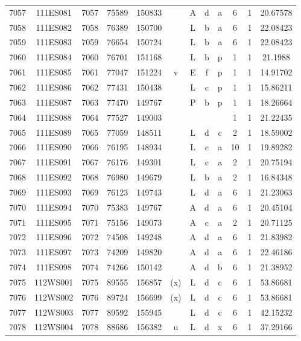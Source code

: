\begin{tabular}{|*{12}{c|}}
7057 & 111ES081 & 7057 & 75589 & 150833 &  & A & d & a & 6 & 1 & 20.67578 \\ 
7058 & 111ES082 & 7058 & 76389 & 150700 &  & L & b & a & 6 & 1 & 22.08423 \\ 
7059 & 111ES083 & 7059 & 76654 & 150724 &  & L & b & a & 6 & 1 & 22.08423 \\ 
7060 & 111ES084 & 7060 & 76701 & 151168 &  & L & b & p & 1 & 1 & 21.1988 \\ 
7061 & 111ES085 & 7061 & 77047 & 151224 & v & E & f & p & 1 & 1 & 14.91702 \\ 
7062 & 111ES086 & 7062 & 77431 & 150438 &  & L & c & p & 1 & 1 & 15.86211 \\ 
7063 & 111ES087 & 7063 & 77470 & 149767 &  & P & b & p & 1 & 1 & 18.26664 \\ 
7064 & 111ES088 & 7064 & 77527 & 149003 &  &  &  &  & 1 & 1 & 21.22435 \\ 
7065 & 111ES089 & 7065 & 77059 & 148511 &  & L & d & c & 2 & 1 & 18.59002 \\ 
7066 & 111ES090 & 7066 & 76195 & 148934 &  & L & c & a & 10 & 1 & 19.89282 \\ 
7067 & 111ES091 & 7067 & 76176 & 149301 &  & L & c & a & 2 & 1 & 20.75194 \\ 
7068 & 111ES092 & 7068 & 76980 & 149679 &  & L & b & a & 2 & 1 & 16.84348 \\ 
7069 & 111ES093 & 7069 & 76123 & 149743 &  & L & d & a & 6 & 1 & 21.23063 \\ 
7070 & 111ES094 & 7070 & 75383 & 149767 &  & A & d & a & 6 & 1 & 20.45104 \\ 
7071 & 111ES095 & 7071 & 75156 & 149073 &  & A & c & a & 2 & 1 & 20.71125 \\ 
7072 & 111ES096 & 7072 & 74508 & 149248 &  & A & d & a & 6 & 1 & 21.83982 \\ 
7073 & 111ES097 & 7073 & 74209 & 149820 &  & A & d & a & 6 & 1 & 22.46186 \\ 
7074 & 111ES098 & 7074 & 74266 & 150142 &  & A & d & b & 6 & 1 & 21.38952 \\ 
7075 & 112WS001 & 7075 & 89555 & 156857 & (x) & L & d & c & 6 & 1 & 53.86681 \\ 
7076 & 112WS002 & 7076 & 89724 & 156699 & (x) & L & d & c & 6 & 1 & 53.86681 \\ 
7077 & 112WS003 & 7077 & 89592 & 155945 &  & L & d & c & 6 & 1 & 42.15232 \\ 
7078 & 112WS004 & 7078 & 88686 & 156382 & u & L & d & x & 6 & 1 & 37.29166 \\ 

\end{tabular}
